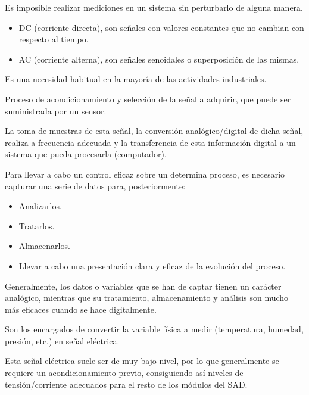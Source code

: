 \documentclass[12pt, letterpaper]{extarticle}
\begin{document}
Es imposible realizar mediciones en un sistema sin perturbarlo de alguna manera.

\begin{itemize}
    \item DC (corriente directa), son señales con valores constantes que no cambian con respecto al tiempo.
    \item AC (corriente alterna), son señales senoidales o superposición de las mismas.
\end{itemize}

\newpage
{}


Es una necesidad habitual en la mayoría de las actividades industriales.

Proceso de acondicionamiento y selección de la señal a adquirir, que puede ser suministrada por un sensor.

La toma de muestras de esta señal, la conversión analógico/digital de dicha señal, realiza a frecuencia adecuada y la transferencia de esta información digital a un sistema que pueda procesarla (computador).

Para llevar a cabo un control eficaz sobre un determina proceso, es necesario capturar una serie de datos para, posteriormente:
\begin{itemize}
    \item Analizarlos.
    \item Tratarlos.
    \item Almacenarlos.
    \item Llevar a cabo una presentación clara y eficaz de la evolución del proceso.
\end{itemize}

Generalmente, los datos o variables que se han de captar tienen un carácter analógico, mientras que su tratamiento, almacenamiento y análisis son mucho más eficaces cuando se hace digitalmente.


Son los encargados de convertir la variable física a medir (temperatura, humedad, presión, etc.) en señal eléctrica.

Esta señal eléctrica suele ser de muy bajo nivel, por lo que generalmente se requiere un acondicionamiento previo, consiguiendo así niveles de tensión/corriente adecuados para el resto de los módulos del SAD.

\end{document}
